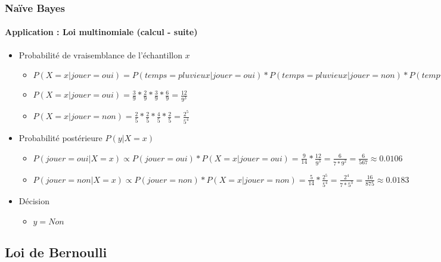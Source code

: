 \documentclass[xcolor=table]{beamer}
\begin{document}
\begin{frame}
	\frametitle{Naïve Bayes}
	\framesubtitle{Application : Loi multinomiale (calcul - suite)}
	
	\begin{itemize}
		\item Probabilité de vraisemblance de l'échantillon $x$
		\begin{itemize}
			\item $P(X=x|jouer=oui) = P(temps=pluvieux|jouer=oui) * P(temps=pluvieux|jouer=non) 
			* P(tempurature=chaude|jouer=oui) * \cdots$
			\item $P(X=x|jouer=oui) = \frac{3}{9} * \frac{2}{9} * \frac{3}{9} * \frac{6}{9} = \frac{12}{9^3}$
			\item $P(X=x|jouer=non) = \frac{2}{5} * \frac{2}{5} * \frac{4}{5} * \frac{2}{5} = \frac{2^5}{5^4}$
		\end{itemize}
		\item Probabilité postérieure $P(y|X=x)$
		\begin{itemize}
			\item $P(jouer=oui|X=x) \propto P(jouer=oui) * P(X=x|jouer=oui) = \frac{9}{14} * \frac{12}{9^3} = \frac{6}{7 * 9^2} = \frac{6}{567} \approx 0.0106$
			\item $P(jouer=non|X=x) \propto P(jouer=non) * P(X=x|jouer=non) = \frac{5}{14} * \frac{2^5}{5^4} = \frac{2^4}{7 * 5^3} = \frac{16}{875} \approx 0.0183$
		\end{itemize}
		\item Décision
		\begin{itemize}
			\item $y=Non$
		\end{itemize}
	\end{itemize}
	
	
\end{frame}


\subsection{Loi de Bernoulli}
\end{document}
